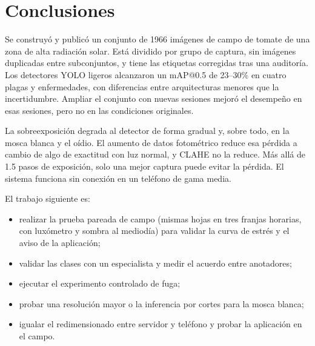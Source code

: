 \documentclass[sensors,article,submit,pdftex,moreauthors]{Definitions/mdpi}
\begin{document}
\section{Conclusiones}

Se construyó y publicó un conjunto de 1966 imágenes de campo de tomate de una zona de alta radiación solar. Está dividido por grupo de captura, sin imágenes duplicadas entre subconjuntos, y tiene las etiquetas corregidas tras una auditoría. Los detectores YOLO ligeros alcanzaron un mAP@0.5 de 23--30\% en cuatro plagas y enfermedades, con diferencias entre arquitecturas menores que la incertidumbre. Ampliar el conjunto con nuevas sesiones mejoró el desempeño en esas sesiones, pero no en las condiciones originales.

La sobreexposición degrada al detector de forma gradual y, sobre todo, en la mosca blanca y el oídio. El aumento de datos fotométrico reduce esa pérdida a cambio de algo de exactitud con luz normal, y CLAHE no la reduce. Más allá de 1.5 pasos de exposición, solo una mejor captura puede evitar la pérdida. El sistema funciona sin conexión en un teléfono de gama media.

El trabajo siguiente es:
\begin{itemize}[leftmargin=*,labelsep=4.9mm]
\item realizar la prueba pareada de campo (mismas hojas en tres franjas horarias, con luxómetro y sombra al mediodía) para validar la curva de estrés y el aviso de la aplicación;
\item validar las clases con un especialista y medir el acuerdo entre anotadores;
\item ejecutar el experimento controlado de fuga;
\item probar una resolución mayor o la inferencia por cortes para la mosca blanca;
\item igualar el redimensionado entre servidor y teléfono y probar la aplicación en el campo.
\end{itemize}

\vspace{6pt}

\end{document}
